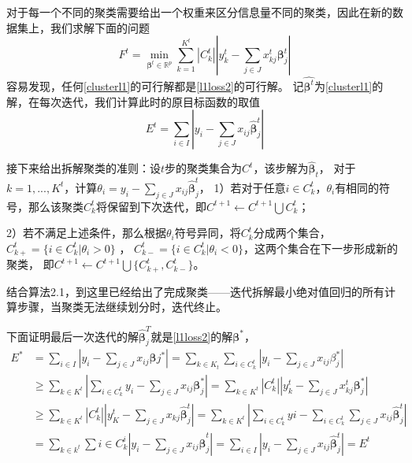 对于每一个不同的聚类需要给出一个权重来区分信息量不同的聚类，因此在新的数据集上，我们求解下面的问题
\begin{equation}\label{clusterl1}
    F^t =\underset{\bm{\beta}^t \in \mathbb{R}^{p}}{\operatorname{min}} 
    \sum_{k=1}^{K^t}|C_k^t||y_k^t - \sum_{j \in J}x_{kj}^t\bm{\beta}_j^t|
\end{equation}
容易发现，任何\eqref{clusterl1}的可行解都是\eqref{l1loss2}的可行解。
记$\hat{\bm{\beta}^t}$为\eqref{clusterl1}的解，在每次迭代，我们计算此时的原目标函数的取值
\begin{equation}
    E^t = \sum_{i \in I} |y_i - \sum_{j \in J}x_{ij}\hat{\bm{\beta}}_j^t|
\end{equation}

接下来给出拆解聚类的准则：设$t$步的聚类集合为$C^{t}$，该步解为$\hat{\bm{\beta}}_t$，
对于$k = 1, ..., K^t$，计算$\theta_i = y_i - \sum_{j \in J}x_{ij}\hat{\bm{\beta}}_j^t$，
1）若对于任意$i \in C_k^t$，$\theta_i$有相同的符号，那么该聚类$C^t_k$将保留到下次迭代，即$C^{t+1} \leftarrow C^{t+1}\bigcup C^t_k$；

2）若不满足上述条件，那么根据$\theta_i$符号异同，将$C^t_k$分成两个集合，$C_{k+}^t = \{i \in C_k^t | \theta_i > 0\}$ ，
$C_{k-}^t = \{i \in C_k^t | \theta_i < 0\}$，这两个集合在下一步形成新的聚类，
即$C^{t+1} \leftarrow C^{t+1}\bigcup \{ C_{k+}^t, C_{k-}^t\}$。

结合算法2.1，到这里已经给出了完成聚类——迭代拆解最小绝对值回归的所有计算步骤，当聚类无法继续划分时，迭代终止。

下面证明最后一次迭代的解$\hat{\bm{\beta}}_j^T$就是\eqref{l1loss2}的解$\bm{\beta}^*$，
\begin{equation*}
    \begin{split}
        E^* & = \sum_{i \in I} |y_i - \sum_{j \in J}x_{ij}\bm{\beta}j^*|
        = \sum_{k \in K_t}\sum_{i \in C_k^t}|y_i - \sum_{j \in J}x_{ij}\beta_j^*| \\
        & \geq \sum_{k \in K^t}|\sum_{i\in C_k^t}y_i - \sum_{j \in J}x_{ij}\bm{\beta}_j^*|
        = \sum_{k \in K^t}|C_k^t||y_k^t - \sum_{j \in J}x_{kj}^t\bm{\beta}_j^*|\\
        & \geq \sum_{k \in K^t} |C_k^t||y_K^t - \sum_{j\in J}x_{kj} \hat{\bm{\beta}}_j^t|
        = \sum_{k \in K^t} |\sum_{i \in C_k^i} yi - \sum_{i \in C_k^t}\sum_{j \in J}x_{ij}\hat{\bm{\beta}}_j^t| \\
        & = \sum_{k \in k^t} \sum{i \in C_k^i}|y_i - \sum_{j \in J}x_{ij}\hat{\bm{\beta}}_j^t|
        = \sum_{i \in I}|y_i - \sum_{j \in J} x_{ij} \hat{\bm{\beta}}_j^t| 
        = E^t
    \end{split}
\end{equation*}

